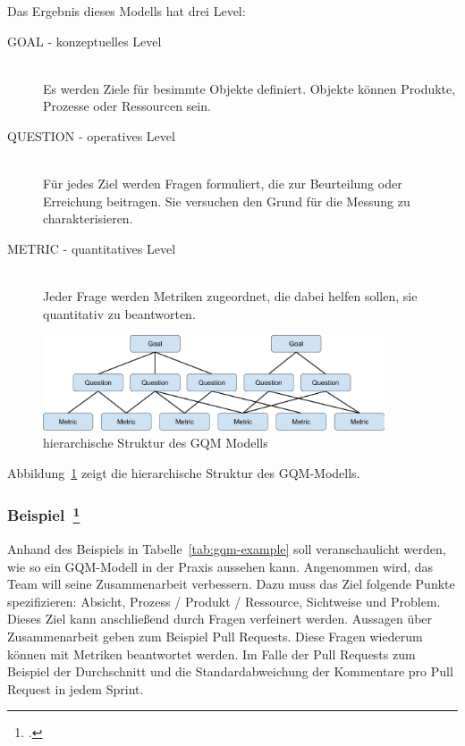 Das Ergebnis dieses Modells hat drei Level:
\begin{description}
  \item[GOAL \mbox{-} konzeptuelles Level] \hfill \\ Es werden Ziele für besimmte Objekte definiert. Objekte können Produkte, Prozesse oder Ressourcen sein.
  \item[QUESTION \mbox{-} operatives Level] \hfill \\ Für jedes Ziel werden Fragen formuliert, die zur Beurteilung oder Erreichung beitragen. Sie versuchen den Grund für die Messung zu charakterisieren.
  \item[METRIC \mbox{-} quantitatives Level] \hfill \\ Jeder Frage werden Metriken zugeordnet, die dabei helfen sollen, sie quantitativ zu beantworten.
\end{description}

\begin{savenotes}
  \begin{figure}[H] 
    \centering
    \includegraphics[width=0.9\textwidth]{img/gqm.png}
    \caption{hierarchische Struktur des GQM Modells}\label{fig:gqm}
  \end{figure}
\end{savenotes}

Abbildung~\ref{fig:gqm} zeigt die hierarchische Struktur des GQM-Modells.

\subsubsection[Beispiel]{Beispiel~\footcite[][]{basili_goal_nodate}}

Anhand des Beispiels in Tabelle~\ref{tab:gqm-example} soll veranschaulicht werden, wie so ein GQM-Modell in der Praxis aussehen kann.
Angenommen wird, das Team will seine Zusammenarbeit verbessern. 
Dazu muss das Ziel folgende Punkte spezifizieren: Absicht, Prozess / Produkt / Ressource, Sichtweise und Problem.
Dieses Ziel kann anschließend durch Fragen verfeinert werden.
Aussagen über Zusammenarbeit geben zum Beispiel Pull Requests.
Diese Fragen wiederum können mit Metriken beantwortet werden.
Im Falle der Pull Requests zum Beispiel der Durchschnitt und die Standardabweichung der Kommentare pro Pull Request in jedem Sprint.

